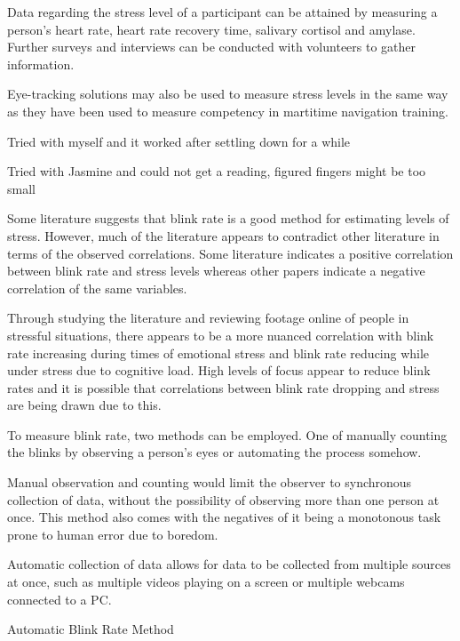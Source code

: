 \documentclass[12pt]{article}
\begin{document}
Data regarding the stress level of a participant can be attained by measuring a person's heart rate, heart rate recovery time, salivary cortisol and amylase. Further surveys and interviews can be conducted with volunteers to gather information. \cite{liu2018impact}

Eye-tracking solutions may also be used to measure stress levels in the same way as they have been used to measure competency in martitime navigation training. \cite{atik2019use}



Tried with myself and it worked after settling down for a while 

Tried with Jasmine and could not get a reading, figured fingers might be too small


Some literature suggests that blink rate is a good method for estimating levels of stress. However, much of the literature appears to contradict other literature in terms of the observed correlations. Some literature indicates a positive correlation between blink rate and stress levels whereas other papers indicate a negative correlation of the same variables. 

Through studying the literature and reviewing footage online of people in stressful situations, there appears to be a more nuanced correlation with blink rate increasing during times of emotional stress and blink rate reducing while under stress due to cognitive load. High levels of focus appear to reduce blink rates and it is possible that correlations between blink rate dropping and stress are being drawn due to this.

To measure blink rate, two methods can be employed. One of manually counting the blinks by observing a person's eyes or automating the process somehow. 

Manual observation and counting would limit the observer to synchronous collection of data, without the possibility of observing more than one person at once. This method also comes with the negatives of it being a monotonous task prone to human error due to boredom. 

Automatic collection of data allows for data to be collected from multiple sources at once, such as multiple videos playing on a screen or multiple webcams connected to a PC.

Automatic Blink Rate Method
\end{document}
